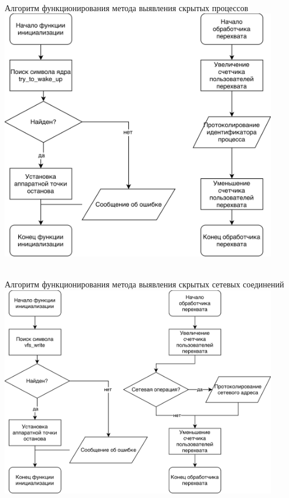 \documentclass{beamer}
\begin{document}
\centering
\Huge
\hfill
\\
\vspace{2em}
Алгоритм функционирования метода выявления скрытых процессов
\vfill
\includegraphics[width=0.9\textwidth]{images_posters/hook_scheduler.png}
\vfill

\newpage
\hfill
\\
\vspace{2em}
Алгоритм функционирования метода выявления скрытых сетевых соединений
\vfill
\includegraphics[width=0.9\textwidth]{images_posters/hook_net.png}
\vfill
\end{document}
